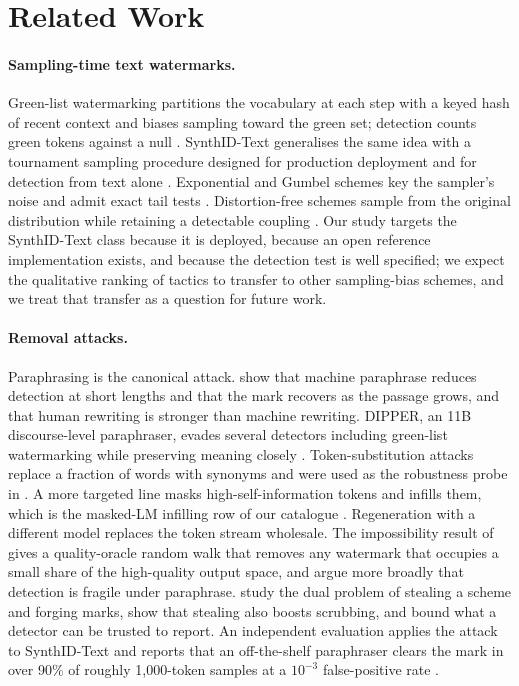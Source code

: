 \section{Related Work}
\label{sec:related}

\paragraph{Sampling-time text watermarks.}
Green-list watermarking partitions the vocabulary at each step with a keyed hash of recent context and biases sampling toward the green set; detection counts green tokens against a null \citep{kgw}. SynthID-Text generalises the same idea with a tournament sampling procedure designed for production deployment and for detection from text alone \citep{synthidtext}. Exponential and Gumbel schemes key the sampler's noise and admit exact tail tests \citep{kuditipudi}. Distortion-free schemes sample from the original distribution while retaining a detectable coupling \citep{christ}. Our study targets the SynthID-Text class because it is deployed, because an open reference implementation exists, and because the detection test is well specified; we expect the qualitative ranking of tactics to transfer to other sampling-bias schemes, and we treat that transfer as a question for future work.

\paragraph{Removal attacks.}
Paraphrasing is the canonical attack. \citet{kgwreliability} show that machine paraphrase reduces detection at short lengths and that the mark recovers as the passage grows, and that human rewriting is stronger than machine rewriting. DIPPER, an 11B discourse-level paraphraser, evades several detectors including green-list watermarking while preserving meaning closely \citep{dipper}. Token-substitution attacks replace a fraction of words with synonyms and were used as the robustness probe in \citet{threebricks}. A more targeted line masks high-self-information tokens and infills them, which is the masked-LM infilling row of our catalogue \citep{sira}. Regeneration with a different model replaces the token stream wholesale. The impossibility result of \citet{sand} gives a quality-oracle random walk that removes any watermark that occupies a small share of the high-quality output space, and \citet{sadasivan} argue more broadly that detection is fragile under paraphrase. \citet{jovanovic} study the dual problem of stealing a scheme and forging marks, show that stealing also boosts scrubbing, and bound what a detector can be trusted to report. An independent evaluation applies the attack to SynthID-Text and reports that an off-the-shelf paraphraser clears the mark in over 90\% of roughly 1,000-token samples at a \(10^{-3}\) false-positive rate \citep{probingsynthid}.

